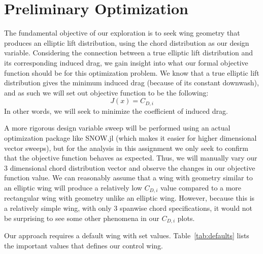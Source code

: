 \documentclass{report}
\begin{document}
\section{Preliminary Optimization}
The fundamental objective of our exploration is to seek wing geometry that produces an elliptic lift distribution, using the chord distribution as our design variable.
Considering the connection between a true elliptic lift distribution and its corresponding induced drag, we gain insight into what our formal objective function should be for this optimization problem.
We know that a true elliptic lift distribution gives the minimum induced drag (because of its constant downwash), and as such we will set out objective function to be the following:
\begin{equation}\label{eq:objectiveFunction}
    J(x) = C_{D,i}
\end{equation}
In other words, we will seek to minimize the coefficient of induced drag.

A more rigorous design variable sweep will be performed using an actual optimization package like SNOW.jl (which makes it easier for higher dimensional vector sweeps), but for the analysis in this assignment we only seek to confirm that the objective function behaves as expected.
Thus, we will manually vary our 3 dimensional chord distribution vector and observe the changes in our objective function value.
We can reasonably assume that a wing with geometry similar to an elliptic wing will produce a relatively low $C_{D,i}$ value compared to a more rectangular wing with geometry unlike an elliptic wing.
However, because this is a relatively simple wing, with only 3 spanwise chord specifications, it would not be surprising to see some other phenomena in our $C_{D,i}$ plots.

Our approach requires a default wing with set values. Table~\ref{tab:defaults} lists the important values that defines our control wing.
\end{document}
